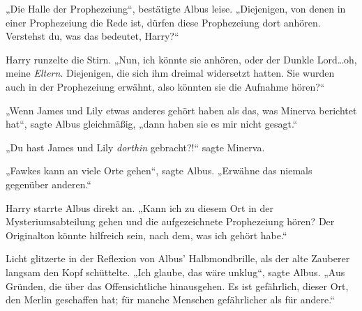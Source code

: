 „Die Halle der Prophezeiung“, bestätigte Albus leise. „Diejenigen, von denen in einer Prophezeiung die Rede ist, dürfen diese Prophezeiung dort anhören. Verstehst du, was das bedeutet, Harry?“

Harry runzelte die Stirn. „Nun, ich könnte sie anhören, oder der Dunkle Lord…oh, meine \emph{Eltern}. Diejenigen, die sich ihm dreimal widersetzt hatten. Sie wurden auch in der Prophezeiung erwähnt, also könnten sie die Aufnahme hören?“

„Wenn James und Lily etwas anderes gehört haben als das, was Minerva berichtet hat“, sagte Albus gleichmäßig, „dann haben sie es mir nicht gesagt.“

„Du hast James und Lily \emph{dorthin} gebracht?!“ sagte Minerva.

„Fawkes kann an viele Orte gehen“, sagte Albus. „Erwähne das niemals gegenüber anderen.“

Harry starrte Albus direkt an. „Kann ich zu diesem Ort in der Mysteriumsabteilung gehen und die aufgezeichnete Prophezeiung hören? Der Originalton könnte hilfreich sein, nach dem, was ich gehört habe.“

Licht glitzerte in der Reflexion von Albus' Halbmondbrille, als der alte Zauberer langsam den Kopf schüttelte. „Ich glaube, das wäre unklug“, sagte Albus. „Aus Gründen, die über das Offensichtliche hinausgehen. Es ist gefährlich, dieser Ort, den Merlin geschaffen hat; für manche Menschen gefährlicher als für andere.“

